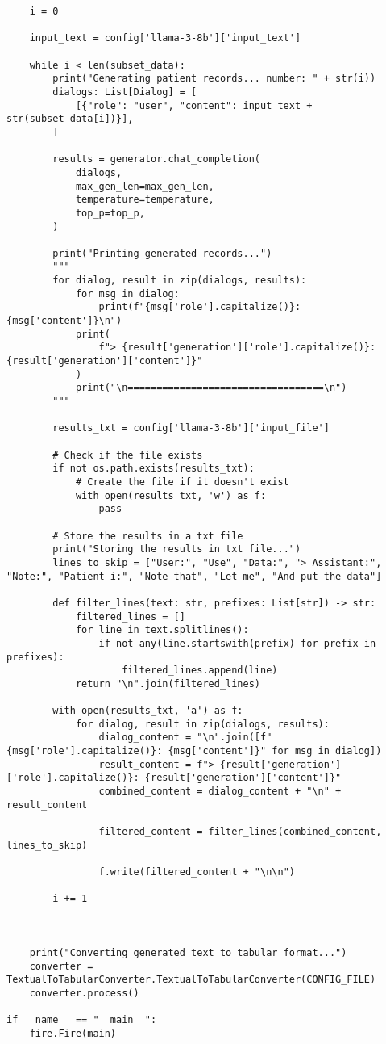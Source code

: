 \begin{verbatim}
    i = 0

    input_text = config['llama-3-8b']['input_text']

    while i < len(subset_data):
        print("Generating patient records... number: " + str(i))
        dialogs: List[Dialog] = [
            [{"role": "user", "content": input_text +  str(subset_data[i])}],
        ]

        results = generator.chat_completion(
            dialogs,
            max_gen_len=max_gen_len,
            temperature=temperature,
            top_p=top_p,
        )

        print("Printing generated records...")
        """
        for dialog, result in zip(dialogs, results):
            for msg in dialog:
                print(f"{msg['role'].capitalize()}: {msg['content']}\n")
            print(
                f"> {result['generation']['role'].capitalize()}: {result['generation']['content']}"
            )
            print("\n==================================\n")
        """
        
        results_txt = config['llama-3-8b']['input_file']

        # Check if the file exists
        if not os.path.exists(results_txt):
            # Create the file if it doesn't exist
            with open(results_txt, 'w') as f:
                pass

        # Store the results in a txt file
        print("Storing the results in txt file...")
        lines_to_skip = ["User:", "Use", "Data:", "> Assistant:", "Note:", "Patient i:", "Note that", "Let me", "And put the data"]

        def filter_lines(text: str, prefixes: List[str]) -> str:
            filtered_lines = []
            for line in text.splitlines():
                if not any(line.startswith(prefix) for prefix in prefixes):
                    filtered_lines.append(line)
            return "\n".join(filtered_lines)

        with open(results_txt, 'a') as f:
            for dialog, result in zip(dialogs, results):
                dialog_content = "\n".join([f"{msg['role'].capitalize()}: {msg['content']}" for msg in dialog])
                result_content = f"> {result['generation']['role'].capitalize()}: {result['generation']['content']}"
                combined_content = dialog_content + "\n" + result_content
                
                filtered_content = filter_lines(combined_content, lines_to_skip)
                
                f.write(filtered_content + "\n\n")

        i += 1
        


    print("Converting generated text to tabular format...")
    converter = TextualToTabularConverter.TextualToTabularConverter(CONFIG_FILE)
    converter.process()

if __name__ == "__main__":
    fire.Fire(main)


\end{verbatim}
